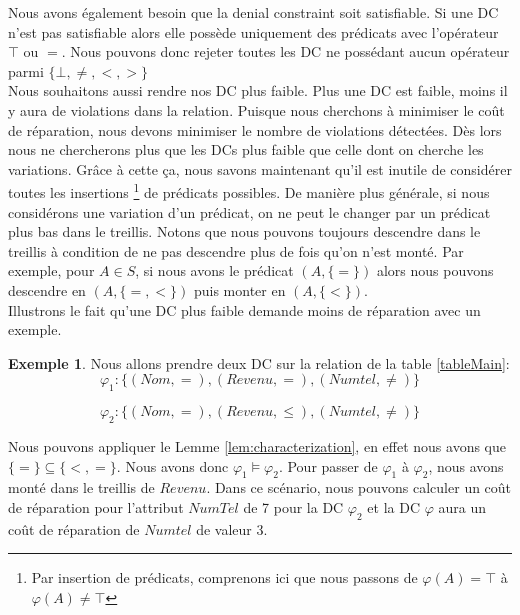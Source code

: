 \documentclass[letterpaper, 12pt]{report}
\theoremstyle{definition}
\newtheorem{myexample}{Exemple}
\begin{document}
Nous avons également besoin que la denial constraint soit satisfiable. Si une DC n'est pas satisfiable alors elle possède uniquement des prédicats avec l'opérateur $\top$ ou $=$. Nous pouvons donc rejeter toutes les DC ne possédant aucun opérateur parmi $\{ \bot,\neq,<,> \}$\\

Nous souhaitons aussi rendre nos DC plus faible. Plus une DC est faible, moins il y aura de violations dans la relation. Puisque nous cherchons à minimiser le coût de réparation, nous devons minimiser le nombre de violations détectées. Dès lors nous ne chercherons plus que les DCs plus faible que celle dont on cherche les variations. Grâce à cette ça, nous savons maintenant qu'il est inutile de considérer toutes les insertions \footnote{Par insertion de prédicats, comprenons ici que nous passons de $\varphi(A) = \top$ à $\varphi(A) \neq \top$} de prédicats possibles. De manière plus générale, si nous considérons une variation d'un prédicat, on ne peut le changer par un prédicat plus bas dans le treillis. Notons que nous pouvons toujours descendre dans le treillis à condition de ne pas descendre plus de fois qu'on n'est monté. Par exemple, pour $A \in S$, si nous avons le prédicat $(A, \{= \})$ alors nous pouvons descendre en $(A,\{=,<\})$ puis monter en $(A, \{ <\})$.\\

 Illustrons le fait qu'une DC plus faible demande moins de réparation avec un exemple. 
\begin{myexample}
Nous allons prendre deux DC sur la relation de la table \ref{tableMain}:
$$ \varphi_1 : \{(Nom,=),(Revenu,=),(Numtel,\neq) \}$$

$$ \varphi_2 : \{(Nom,=),(Revenu,\leq),(Numtel,\neq) \}$$

\end{myexample}



Nous pouvons appliquer le Lemme \ref{lem:characterization}, en effet nous avons que $\{=\} \subseteq \{ <, = \}$. Nous avons donc $\varphi_1 \models \varphi_2$. Pour passer de $\varphi_1$ à $\varphi_2$, nous avons monté dans le treillis de $Revenu$. Dans ce scénario, nous pouvons calculer un coût de réparation pour l'attribut $NumTel$ de 7 pour la DC $\varphi_2$ et la DC $\varphi$ aura un coût de réparation de $Numtel$ de valeur 3.
\end{document}
